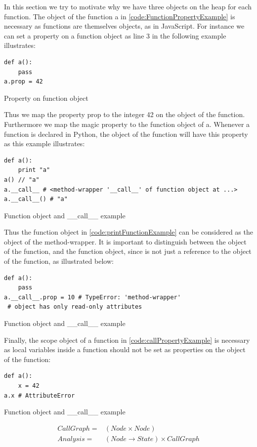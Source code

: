 In this section we try to motivate why we have three objects on the heap for each function. The object of the function a in \ref{code:FunctionPropertyExample} is necessary as functions are themselves objects, as in JavaScript. For instance we can set a property on a function object as line 3 in the following example illustrates:
\begin{listing}[H]
	\begin{verbatim}
def a():
	pass
a.prop = 42
	\end{verbatim}
\caption{Property on function object}\label{code:FunctionPropertyExample}
\end{listing}
Thus we map the property prop to the integer 42 on the object of the function. Furthermore we map the magic property  to the function object of a. Whenever a function is declared in Python, the object of the function will have this property as this example illustrates:
\begin{listing}[H]
	\begin{verbatim}
def a():
	print "a"
a() // "a"
a.__call__ # <method-wrapper '__call__' of function object at ...> 
a.__call__() # "a"
	\end{verbatim}
\caption{Function object and \_\_call\_\_ example}\label{code:printFunctionExample}
\end{listing}
Thus the function object in \ref{code:printFunctionExample} can be considered as the object of the method-wrapper. It is important to distinguish between the object of the function, and the function object, since  is not just a reference to the object of the function, as illustrated below:
\begin{listing}[H]
	\begin{verbatim}
def a(): 
	pass
a.__call__.prop = 10 # TypeError: 'method-wrapper' 
 # object has only read-only attributes
	\end{verbatim}
\caption{Function object and \_\_call\_\_ example}\label{code:callPropertyExample}
\end{listing}
Finally, the scope object of a function in \ref{code:callPropertyExample} is necessary as local variables inside a function should not be set as properties on the object of the function:
\begin{listing}[H]
	\begin{verbatim}
def a(): 
	x = 42
a.x # AttributeError
	\end{verbatim}
\caption{Function object and \_\_call\_\_ example}\label{code:callPropertyExample}
\end{listing}
\begin{eqnarray*}
CallGraph =& (Node \times Node) \\
Analysis =& (Node \rightarrow State) \times CallGraph
\end{eqnarray*}



